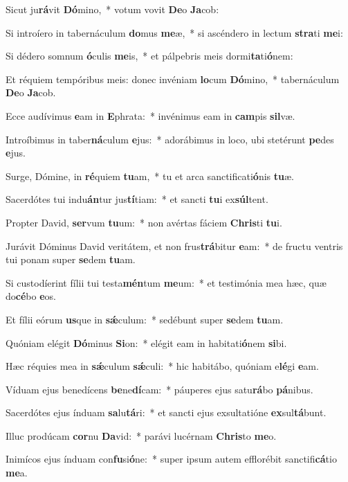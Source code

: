 \item Sicut ju\textbf{rá}vit \textbf{Dó}mino,~* votum vovit \textbf{De}o \textbf{Ja}cob:
\item Si introíero in tabernáculum \textbf{do}mus \textbf{me}æ,~* si ascéndero in lectum \textbf{stra}ti \textbf{me}i:
\item Si dédero somnum \textbf{ó}culis \textbf{me}is,~* et pálpebris meis dormi\textbf{ta}ti\textbf{ó}nem:
\item Et réquiem tempóribus meis: donec invéniam \textbf{lo}cum \textbf{Dó}mino,~* tabernáculum \textbf{De}o \textbf{Ja}cob.
\item Ecce audívimus \textbf{e}am in \textbf{E}phrata:~* invénimus eam in \textbf{cam}pis \textbf{sil}væ.
\item Introíbimus in taber\textbf{ná}culum \textbf{e}jus:~* adorábimus in loco, ubi stetérunt \textbf{pe}des \textbf{e}jus.
\item Surge, Dómine, in \textbf{ré}quiem \textbf{tu}am,~* tu et arca sanctificati\textbf{ó}nis \textbf{tu}æ.
\item Sacerdótes tui indu\textbf{án}tur jus\textbf{tí}tiam:~* et sancti \textbf{tu}i ex\textbf{súl}tent.
\item Propter David, \textbf{ser}vum \textbf{tu}um:~* non avértas fáciem \textbf{Chris}ti \textbf{tu}i.
\item Jurávit Dóminus David veritátem, et non frus\textbf{trá}bitur \textbf{e}am:~* de fructu ventris tui ponam super \textbf{se}dem \textbf{tu}am.
\item Si custodíerint fílii tui testa\textbf{mén}tum \textbf{me}um:~* et testimónia mea hæc, quæ do\textbf{cé}bo \textbf{e}os.
\item Et fílii eórum \textbf{us}que in \textbf{sǽ}culum:~* sedébunt super \textbf{se}dem \textbf{tu}am.
\item Quóniam elégit \textbf{Dó}minus \textbf{Si}on:~* elégit eam in habitati\textbf{ó}nem \textbf{si}bi.
\item Hæc réquies mea in \textbf{sǽ}culum \textbf{sǽ}culi:~* hic habitábo, quóniam e\textbf{lé}gi \textbf{e}am.
\item Víduam ejus benedícens \textbf{be}ne\textbf{dí}cam:~* páuperes ejus satu\textbf{rá}bo \textbf{pá}nibus.
\item Sacerdótes ejus índuam \textbf{sa}lu\textbf{tá}ri:~* et sancti ejus exsultatióne \textbf{ex}sul\textbf{tá}bunt.
\item Illuc prodúcam \textbf{cor}nu \textbf{Da}vid:~* parávi lucérnam \textbf{Chris}to \textbf{me}o.
\item Inimícos ejus índuam con\textbf{fu}si\textbf{ó}ne:~* super ipsum autem efflorébit sanctifi\textbf{cá}tio \textbf{me}a.
